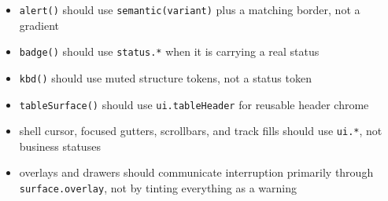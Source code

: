 \begin{itemize}
\tightlist
\item
  \texttt{a\allowbreak{}l\allowbreak{}e\allowbreak{}r\allowbreak{}t\allowbreak{}(\allowbreak{})} should use \texttt{s\allowbreak{}e\allowbreak{}m\allowbreak{}a\allowbreak{}n\allowbreak{}t\allowbreak{}i\allowbreak{}c\allowbreak{}(\allowbreak{}v\allowbreak{}a\allowbreak{}r\allowbreak{}i\allowbreak{}a\allowbreak{}n\allowbreak{}t\allowbreak{})} plus a matching border, not a gradient
\item
  \texttt{b\allowbreak{}a\allowbreak{}d\allowbreak{}g\allowbreak{}e\allowbreak{}(\allowbreak{})} should use \texttt{s\allowbreak{}t\allowbreak{}a\allowbreak{}t\allowbreak{}u\allowbreak{}s\allowbreak{}.\allowbreak{}*} when it is carrying a real status
\item
  \texttt{k\allowbreak{}b\allowbreak{}d\allowbreak{}(\allowbreak{})} should use muted structure tokens, not a status token
\item
  \texttt{t\allowbreak{}a\allowbreak{}b\allowbreak{}l\allowbreak{}e\allowbreak{}S\allowbreak{}u\allowbreak{}r\allowbreak{}f\allowbreak{}a\allowbreak{}c\allowbreak{}e\allowbreak{}(\allowbreak{})} should use \texttt{u\allowbreak{}i\allowbreak{}.\allowbreak{}t\allowbreak{}a\allowbreak{}b\allowbreak{}l\allowbreak{}e\allowbreak{}H\allowbreak{}e\allowbreak{}a\allowbreak{}d\allowbreak{}e\allowbreak{}r} for reusable header chrome
\item
  shell cursor, focused gutters, scrollbars, and track fills should use \texttt{u\allowbreak{}i\allowbreak{}.\allowbreak{}*}, not business statuses
\item
  overlays and drawers should communicate interruption primarily through \texttt{s\allowbreak{}u\allowbreak{}r\allowbreak{}f\allowbreak{}a\allowbreak{}c\allowbreak{}e\allowbreak{}.\allowbreak{}o\allowbreak{}v\allowbreak{}e\allowbreak{}r\allowbreak{}l\allowbreak{}a\allowbreak{}y}, not by tinting everything as a warning
\end{itemize}

